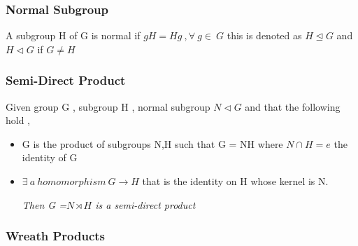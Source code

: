 \documentclass{article}
\begin{document}
\subsubsection{Normal Subgroup}
A subgroup H of G is normal if $ gH=Hg\ , \forall \ g \in \ G$ this is denoted as $H\trianglelefteq G$ and $H\triangleleft G$ if $G \neq H$

\subsubsection{Semi-Direct Product}
Given group G , subgroup H , normal subgroup $N \triangleleft G$ and that the following hold ,
\begin{itemize}
\item G is the product of subgroups N,H such that G = NH where $N \cap H = {e}$ the identity of G
\item $\exists \ a \ homomorphism \ G \rightarrow H$ that is the identity on H whose kernel is N.

\textit{Then G =$N \rtimes H$ is a semi-direct product}

\end{itemize}

\subsubsection{Wreath Products}
\end{document}
